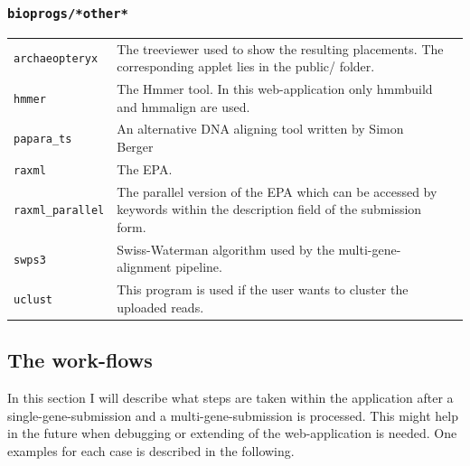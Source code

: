 \documentclass{scrartcl}
\begin{document}
				\subsubsection{\texttt{bioprogs/*other*}}
					\begin{tabular}[c]{lp{10.8cm}l}
						\texttt{archaeopteryx}  & The treeviewer used to show the resulting placements. The corresponding applet lies in the public/ folder. \\
						\texttt{hmmer}  & The Hmmer tool. In this web-application only  hmmbuild and hmmalign are used.  \\
						\texttt{papara\_ts}  & An alternative DNA aligning tool written by Simon Berger \\
						\texttt{raxml}  & The EPA. \\
						\texttt{raxml\_parallel}  & The parallel version of the EPA which can be accessed by keywords within the description field of the submission form. \\
						\texttt{swps3}  & Swiss-Waterman algorithm used by the multi-gene-alignment pipeline. \\
						\texttt{uclust}  & This program is used if the user wants to cluster the uploaded reads. \\
					\end{tabular}
					
		\subsection{The work-flows}
			In this section I will describe what steps are taken within the application after a single-gene-submission and a multi-gene-submission is processed. This might help in the future when debugging or extending of the web-application is needed. One examples for each case is described in the following.
		
\end{document}
